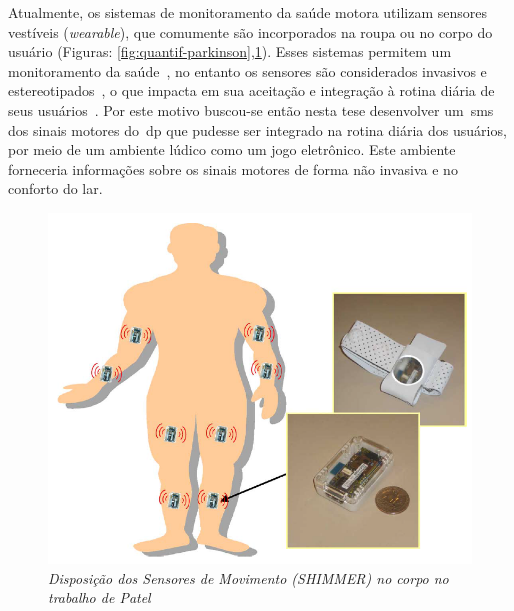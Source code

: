 Atualmente, os sistemas de monitoramento da saúde motora utilizam sensores vestíveis (\textit{wearable}), que comumente são incorporados na roupa ou no corpo do usuário (Figuras: \ref{fig:quantif-parkinson},\ref{fig:patel-shimmer}). Esses sistemas permitem um monitoramento da saúde~\cite{patel_monitoring_2009,lemoyne2010}, no entanto os sensores são considerados invasivos e estereotipados~\cite{aarhus_negotiating_2010}, o que impacta em sua aceitação e integração à rotina diária de seus usuários~\cite{alemdar2015}. Por este motivo buscou-se então nesta tese desenvolver um~\ac{sms} dos sinais motores do~\ac{dp} que pudesse ser integrado na rotina diária dos usuários, por meio de um ambiente lúdico como um jogo eletrônico. Este ambiente forneceria informações sobre os sinais motores de forma não invasiva e no conforto do lar. 


\begin{figure}
 \centering
 \includegraphics[scale=0.3]{./img/patel-shimmer.png}
\caption[Disposição dos Sensores de Movimento (SHIMMER) no corpo no trabalho de Patel]{\textit{Disposição dos Sensores de Movimento (SHIMMER) no corpo no trabalho de Patel ~\cite{patel_monitoring_2009}}}
 \label{fig:patel-shimmer}
\end{figure}




